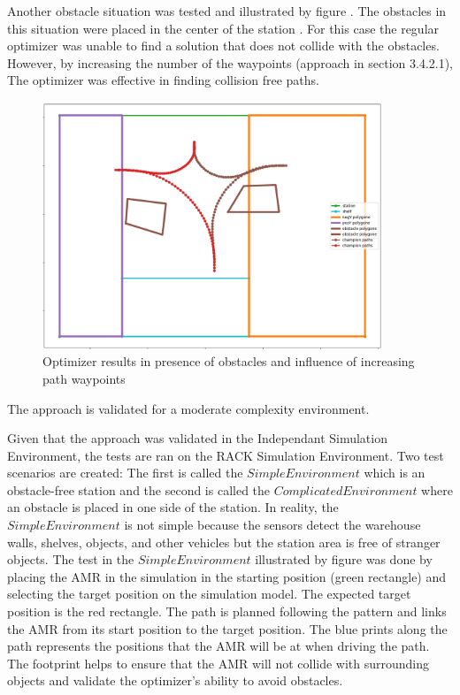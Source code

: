 Another obstacle situation was tested and illustrated by figure .
The obstacles in this situation were placed in the center of the station . 
For this case the regular optimizer was unable to find a solution that does not collide 
with the obstacles. However, by increasing the number of the waypoints (approach in section 3.4.2.1),
The optimizer was effective in finding collision free paths. 


\begin{figure}[H]
    \begin{center}
        \includegraphics[width=4in]{images/Chap3/Figure_6.png} %
        \caption{Optimizer results in presence of obstacles and influence of increasing path waypoints}
        \label{OptResult3}
        \end{center}    
\end{figure}

The approach is validated for a moderate complexity environment.

Given that the approach was validated in the Independant Simulation Environment, the tests are 
ran on the RACK Simulation Environment. Two test scenarios are created: 
The first is called the \(Simple Environment\) which is an obstacle-free station and the second is
called the \(Complicated Environment\) where an obstacle is placed in one side of the station. 
In reality, the \(Simple Environment\) is not simple because the sensors detect the warehouse walls,
shelves, objects, and other vehicles but the station area is free of stranger objects.
The test in the \(Simple Environment\) illustrated by figure  was done by placing the 
AMR in the simulation in the starting position (green rectangle) and selecting the target position on 
the simulation model. The expected target position is the red rectangle. 
The path is planned following the pattern and links the AMR from its start position to the target position.
The blue prints along the path represents the positions that the AMR will be at when driving the path.
The footprint helps to ensure that the AMR will not collide with surrounding objects and 
validate the optimizer's ability to avoid obstacles. 

